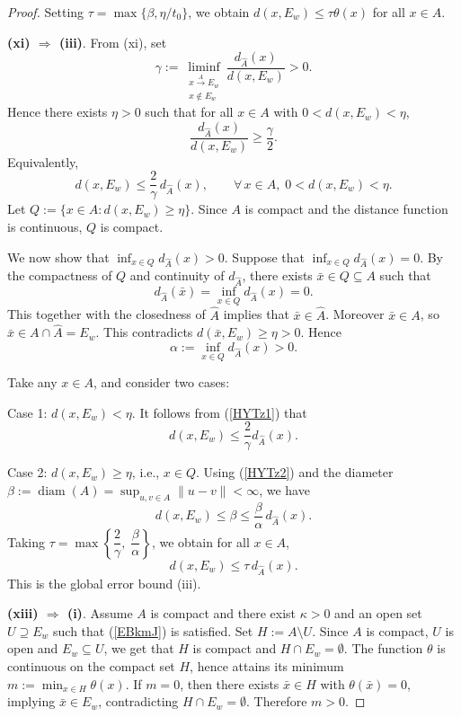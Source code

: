 \documentclass[11pt]{article}
\begin{document}
\begin{proof}
	Setting \(\tau = \max\{\beta, \eta/t_0\}\), we obtain \(d(x, E_w) \le \tau \theta(x)\) for all \(x \in A\). 
	
	\noindent\textbf{(xi) $\Rightarrow$ (iii)}.
	From (xi), set
	\[
	\gamma := \liminf_{\substack{x\xrightarrow{A}E_w\\ x\notin E_w}} \frac{d_{\widehat{A}}(x)}{d(x,E_w)} > 0.
	\]
	Hence there exists $\eta>0$ such that for all $x\in A$ with $0<d(x,E_w)<\eta$,
	\[
	\frac{d_{\widehat{A}}(x)}{d(x,E_w)} \ge \frac{\gamma}{2} .
	\]
	Equivalently,
\begin{equation}\label{HYTz1}
	d(x,E_w) \le \frac{2}{\gamma}\, d_{\widehat{A}}(x), \qquad \forall\,x\in A,\; 0<d(x,E_w)<\eta.  
 \end{equation}
		Let $Q := \{x\in A : d(x,E_w)\ge \eta\}$. Since $A$ is compact and the distance function is continuous, $Q$ is compact.
	
	We now show that $\inf_{x\in Q} d_{\widehat{A}}(x) > 0$.
	Suppose that  $\inf_{x\in Q} d_{\widehat{A}}(x) = 0$.   By the compactness of $Q$ and continuity of $d_{\widehat{A}}$,  there exists  $\bar{x}\in Q \subseteq A$ such that
	$$d_{\widehat{A}}(\bar{x})=  \inf_{x\in Q} d_{\widehat{A}}(x) = 0 .$$
	This together with  the  closedness of  $\widehat{A}$  implies that $\bar{x}\in \widehat{A}$.
	 Moreover $\bar{x}\in A$, so $\bar{x}\in A\cap\widehat{A}=E_w$. This contradicts $d(\bar{x},E_w)\ge \eta>0$. Hence
\begin{equation}\label{HYTz2}
	\alpha := \inf_{x\in Q} d_{\widehat{A}}(x) >0.  
 \end{equation}
	
	Take any $x\in A$, and consider two cases:
 
 Case 1:  $d(x,E_w)<\eta$.  It follows from  (\ref{HYTz1})  that
		\[
		d(x,E_w)\le \frac{2}{\gamma} d_{\widehat{A}}(x).
		\]
		
	  Case 2:   $d(x,E_w)\ge \eta$, i.e., $x\in Q$. Using  (\ref{HYTz2})    and the diameter $\beta :=\operatorname{diam}(A)=\sup_{u,v\in A}\|u-v\|<\infty$,  we have 
		\[
		d(x,E_w) \le \beta \le \frac{\beta}{\alpha}\, d_{\widehat{A}}(x).
		\]
 	Taking $\tau = \max\left\{\dfrac{2}{\gamma},\; \dfrac{\beta}{\alpha}\right\}$, we obtain for all $x\in A$,
	\[
	d(x,E_w) \le \tau\, d_{\widehat{A}}(x).
	\]
	This is the global error bound (iii).
	
	\noindent\textbf{(xiii) $\Rightarrow$ (i)}.
	Assume $A$ is compact   and there exist $\kappa>0$ and an open set $U\supseteq E_w$ such that
  (\ref{EBkmJ})  is satisfied.   
	Set $H:=A\setminus U$.   Since   $A$ is compact, $U$ is open and $E_w \subseteq U$,  we get that  $H$ is compact   and $H\cap E_w= \emptyset$.
	The function $\theta$ is continuous on the compact set $H$, hence attains its minimum $m:=\min_{x\in H}\theta(x)$.
	If $m=0$, then there exists $\bar x\in H$ with $\theta(\bar x)=0$, implying $\bar x\in E_w$, contradicting $H\cap E_w= \emptyset$. Therefore $m>0$.
	

\end{proof}
\end{document}
